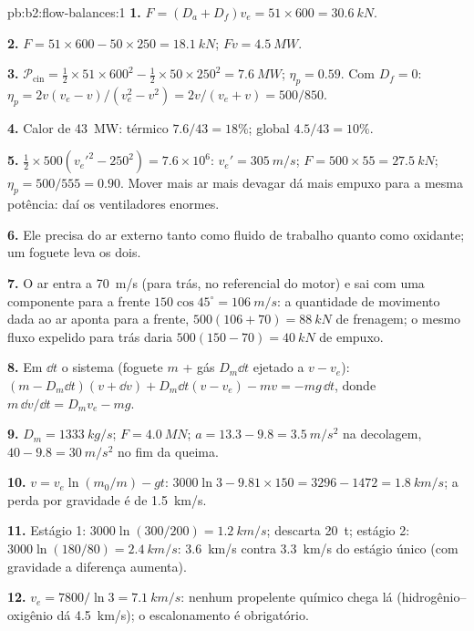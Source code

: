 \begin{solution}{pb:b2:flow-balances:1}
\textbf{1.} $F = (D_a + D_f)v_e = 51 \times 600 = \qty{30.6}{kN}$.

\textbf{2.} $F = 51 \times 600 - 50 \times 250 = \qty{18.1}{kN}$; $Fv = \qty{4.5}{MW}$.

\textbf{3.} $\mathcal P_{\text{cin}} = \tfrac12 \times 51 \times 600^2 - \tfrac12 \times 50 \times 250^2 =
\qty{7.6}{MW}$; $\eta_p = 0.59$. Com $D_f = 0$: $\eta_p = 2v(v_e - v)/(v_e^2 - v^2)
= 2v/(v_e + v) = 500/850$.

\textbf{4.} Calor de \qty{43}{MW}: térmico $7.6/43 = 18\%$; global $4.5/43 = 10\%$.

\textbf{5.} $\tfrac12 \times 500(v_e'^2 - 250^2) = 7.6 \times 10^6$: $v_e' = \qty{305}{m/s}$;
$F = 500 \times 55 = \qty{27.5}{kN}$; $\eta_p = 500/555 = 0.90$. Mover mais ar mais
devagar dá mais empuxo para a mesma potência: daí os ventiladores enormes.

\textbf{6.} Ele precisa do ar externo tanto como fluido de trabalho quanto como
oxidante; um foguete leva os dois.

\textbf{7.} O ar entra a \qty{70}{m/s} (para trás, no referencial do motor)
e sai com uma componente para a frente $150\cos45^\circ = \qty{106}{m/s}$: a
quantidade de movimento dada ao ar aponta para a frente, $500(106 + 70) = \qty{88}{kN}$ de
frenagem; o mesmo fluxo expelido para trás daria $500(150 - 70) =
\qty{40}{kN}$ de empuxo.

\textbf{8.} Em $\dd t$ o sistema (foguete $m$ + gás $D_m\dd t$ ejetado a
$v - v_e$): $(m - D_m\dd t)(v + \dd v) + D_m\dd t(v - v_e) - mv = -mg\,\dd t$,
donde $m\,\dd v/\dd t = D_mv_e - mg$.

\textbf{9.} $D_m = \qty{1333}{kg/s}$; $F = \qty{4.0}{MN}$; $a = 13.3 - 9.8 =
\qty{3.5}{m/s^2}$ na decolagem, $40 - 9.8 = \qty{30}{m/s^2}$ no fim da queima.

\textbf{10.} $v = v_e\ln(m_0/m) - gt$: $3000\ln3 - 9.81 \times 150 = 3296 - 1472 =
\qty{1.8}{km/s}$; a perda por gravidade é de \qty{1.5}{km/s}.

\textbf{11.} Estágio 1: $3000\ln(300/200) = \qty{1.2}{km/s}$; descarta \qty{20}{t}; estágio
2: $3000\ln(180/80) = \qty{2.4}{km/s}$: \qty{3.6}{km/s} contra \qty{3.3}{km/s}
do estágio único (com gravidade a diferença aumenta).

\textbf{12.} $v_e = 7800/\ln3 = \qty{7.1}{km/s}$: nenhum propelente químico
chega lá (hidrogênio--oxigênio dá \qty{4.5}{km/s}); o escalonamento é obrigatório.


\end{solution}
